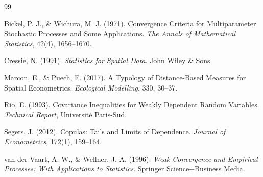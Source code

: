 \documentclass[12pt]{article}
\theoremstyle{plain}
\theoremstyle{definition}
\newcommand{\1}[1]{\mathbf{1}_{#1}}
\begin{document}

\begin{thebibliography}{99}

Bickel, P. J., \& Wichura, M. J. (1971).
Convergence Criteria for Multiparameter Stochastic Processes and Some Applications.
\textit{The Annals of Mathematical Statistics}, 42(4), 1656--1670.

Cressie, N. (1991).
\textit{Statistics for Spatial Data}.
John Wiley \& Sons.

Marcon, E., \& Puech, F. (2017).
A Typology of Distance-Based Measures for Spatial Econometrics.
\textit{Ecological Modelling}, 330, 30--37.

Rio, E. (1993).
Covariance Inequalities for Weakly Dependent Random Variables.
\textit{Technical Report}, Université Paris-Sud.

Segers, J. (2012).
Copulas: Tails and Limits of Dependence.
\textit{Journal of Econometrics}, 172(1), 159--164.

van der Vaart, A. W., \& Wellner, J. A. (1996).
\textit{Weak Convergence and Empirical Processes: With Applications to Statistics}.
Springer Science+Business Media.

\end{thebibliography}
\end{document}
